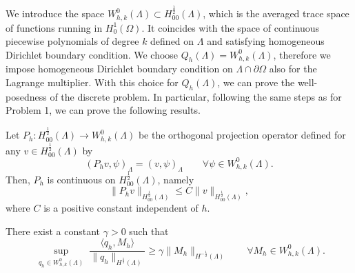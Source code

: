We introduce the space
$W_{h,k}^0(\Lambda) \subset H^{\frac 12} _{00} (\Lambda)$, which is the averaged trace space of functions running in $H^1_0(\Omega)$. It coincides with the space of continuous piecewise polynomials of degree $k$ defined on $\Lambda$ and satisfying homogeneous Dirichlet boundary condition.
We choose $Q_h(\Lambda)=W_{h,k}^0(\Lambda)$, therefore we impose homogeneous Dirichlet boundary condition on $\Lambda \cap \partial \Omega$ also for the Lagrange multiplier. With this choice for $Q_h(\Lambda)$, we can prove the well-posedness of the discrete problem. In particular, following the same steps as for Problem 1, we can prove the following results.
\begin{lemma}
Let $P_h: H^{\frac 12}_{00}(\Lambda) \longrightarrow W_{h,k}^0(\Lambda)$ be the orthogonal projection operator defined  for any $v \in H^{\frac 12}_{00}(\Lambda)$ by
\begin{equation*}
(P_h v , \psi)_\Lambda= (v, \psi)_\Lambda \qquad \forall \psi \in W_{h,k}^0(\Lambda).  
\end{equation*} 
Then, $P_h$ is continuous on $H^{\frac 12}_{00}(\Lambda)$, namely
\begin{equation*}
\|P_h v\|_{H^{\frac 12}_{00}(\Lambda)} \leq C \|v\|_{H^{\frac 12}_{00}(\Lambda)},
\end{equation*}
where $C$ is a positive constant independent of $h$.
\end{lemma}

\begin{lemma}\label{infsup_avr_trspace}
There exist a constant $\gamma >0$ such that
\begin{equation*}
\sup_{\substack{q_h \in W_{h,k}^0(\Lambda)}} \frac{\langle q_h , M_h \rangle}{ \|q_h\|_{H^{\frac 12}(\Lambda)}} \geq \gamma \|M_h\|_{H^{-\frac 12}(\Lambda)} \qquad \forall M_h \in W_{h,k}^0(\Lambda).
\end{equation*} 
\end{lemma}

